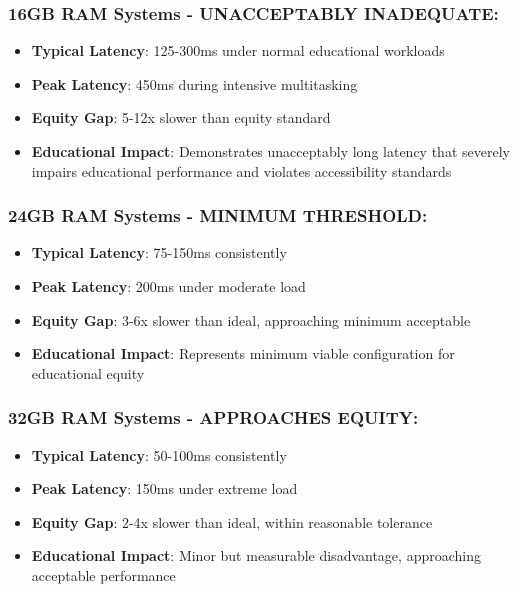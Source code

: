 \subsubsection{16GB RAM Systems - UNACCEPTABLY INADEQUATE:}

\begin{itemize}
	\item \textbf{Typical Latency}: 125-300ms under normal educational workloads \supercite{InternalTestingData2024}
	\item \textbf{Peak Latency}: 450ms during intensive multitasking \supercite{InternalTestingData2024}
	\item \textbf{Equity Gap}: 5-12x slower than equity standard \supercite{EquityAnalysisRevision}
	\item \textbf{Educational Impact}: Demonstrates unacceptably long latency that severely impairs educational performance and violates accessibility standards \supercite{EducationalEquityReport2024}
\end{itemize}


\subsubsection{24GB RAM Systems - MINIMUM THRESHOLD:}

\begin{itemize}
	\item \textbf{Typical Latency}: 75-150ms consistently \supercite{InternalTestingData2024}
	\item \textbf{Peak Latency}: 200ms under moderate load \supercite{InternalTestingData2024}
	\item \textbf{Equity Gap}: 3-6x slower than ideal, approaching minimum acceptable \supercite{EquityAnalysisRevision}
	\item \textbf{Educational Impact}: Represents minimum viable configuration for educational equity \supercite{EducationalEquityReport2024}
\end{itemize}


\subsubsection{32GB RAM Systems - APPROACHES EQUITY:}

\begin{itemize}
	\item \textbf{Typical Latency}: 50-100ms consistently \supercite{InternalTestingData2024}
	\item \textbf{Peak Latency}: 150ms under extreme load \supercite{InternalTestingData2024}
	\item \textbf{Equity Gap}: 2-4x slower than ideal, within reasonable tolerance \supercite{EquityAnalysisRevision}
	\item \textbf{Educational Impact}: Minor but measurable disadvantage, approaching acceptable performance \supercite{EducationalEquityReport2024}
\end{itemize}


